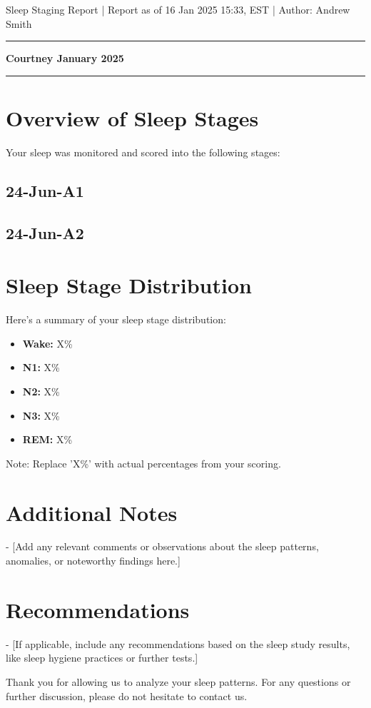 \documentclass{article}
\begin{document}
\noindent\small Sleep Staging Report | Report as of 16 Jan 2025 15:33, EST | Author: Andrew Smith
\vspace{5pt}
\hrule
\vspace{10pt}
\noindent\Huge\textbf{Courtney January 2025}
\vspace{40pt}
\hrule
  
\small
\section*{Overview of Sleep Stages}
Your sleep was monitored and scored into the following stages:

\subsection*{ 24-Jun-A1 }
\begin{center}
\begin{adjustbox}{width=0.75\textwidth}

\end{adjustbox}
\end{center}

\subsection*{ 24-Jun-A2 }
\begin{center}
\begin{adjustbox}{width=0.75\textwidth}

\end{adjustbox}
\end{center}

\section*{Sleep Stage Distribution}
Here's a summary of your sleep stage distribution:

\begin{itemize}
  \item \textbf{Wake:} X\% 
  \item \textbf{N1:} X\%
  \item \textbf{N2:} X\%
  \item \textbf{N3:} X\%
  \item \textbf{REM:} X\%
\end{itemize}

Note: Replace 'X\%' with actual percentages from your scoring.

\section*{Additional Notes}
- [Add any relevant comments or observations about the sleep patterns, anomalies, or noteworthy findings here.]

\section*{Recommendations}
- [If applicable, include any recommendations based on the sleep study results, like sleep hygiene practices or further tests.]

Thank you for allowing us to analyze your sleep patterns. For any questions or further discussion, please do not hesitate to contact us.
\end{document}
